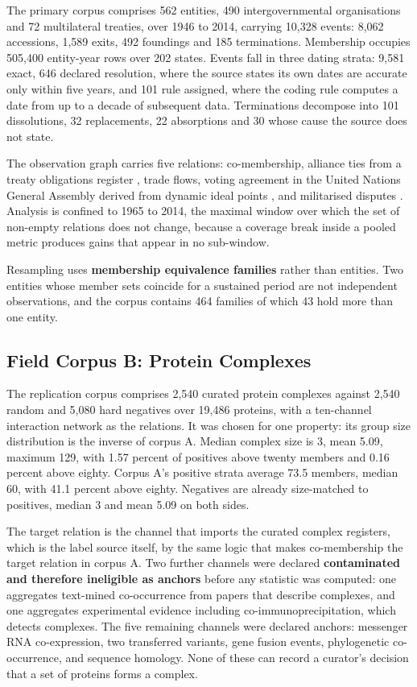 \documentclass[twoside,11pt]{article}
\begin{document}
The primary corpus comprises 562 entities, 490 intergovernmental organisations and 72 multilateral treaties, over 1946 to 2014, carrying 10,328 events: 8,062 accessions, 1,589 exits, 492 foundings and 185 terminations. Membership occupies 505,400 entity-year rows over 202 states. Events fall in three dating strata: 9,581 exact, 646 declared resolution, where the source states its own dates are accurate only within five years, and 101 rule assigned, where the coding rule computes a date from up to a decade of subsequent data. Terminations decompose into 101 dissolutions, 32 replacements, 22 absorptions and 30 whose cause the source does not state.

The observation graph carries five relations: co-membership, alliance ties from a treaty obligations register \citep{atop}, trade flows, voting agreement in the United Nations General Assembly derived from dynamic ideal points \citep{bailey}, and militarised disputes \citep{mid5}. Analysis is confined to 1965 to 2014, the maximal window over which the set of non-empty relations does not change, because a coverage break inside a pooled metric produces gains that appear in no sub-window.

Resampling uses \textbf{membership equivalence families} rather than entities. Two entities whose member sets coincide for a sustained period are not independent observations, and the corpus contains 464 families of which 43 hold more than one entity.

\subsection{Field Corpus B: Protein Complexes}

The replication corpus comprises 2,540 curated protein complexes against 2,540 random and 5,080 hard negatives over 19,486 proteins, with a ten-channel interaction network as the relations. It was chosen for one property: its group size distribution is the inverse of corpus A. Median complex size is 3, mean 5.09, maximum 129, with 1.57 percent of positives above twenty members and 0.16 percent above eighty. Corpus A's positive strata average 73.5 members, median 60, with 41.1 percent above eighty. Negatives are already size-matched to positives, median 3 and mean 5.09 on both sides.

The target relation is the channel that imports the curated complex registers, which is the label source itself, by the same logic that makes co-membership the target relation in corpus A. Two further channels were declared \textbf{contaminated and therefore ineligible as anchors} before any statistic was computed: one aggregates text-mined co-occurrence from papers that describe complexes, and one aggregates experimental evidence including co-immunoprecipitation, which detects complexes. The five remaining channels were declared anchors: messenger RNA co-expression, two transferred variants, gene fusion events, phylogenetic co-occurrence, and sequence homology. None of these can record a curator's decision that a set of proteins forms a complex.
\end{document}
